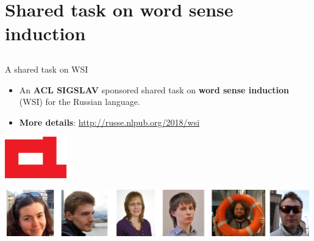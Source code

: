 \section{Shared task on word sense induction}

\subsection{}

\begin{frame}{A shared task on WSI}
  
  \begin{itemize}
  \item An \textbf{\alert{ACL SIGSLAV}} sponsored shared task on \textbf{word sense induction} (WSI) for the Russian language.
 \end{itemize} 
  
  \begin{itemize}
    \item \textbf{More details}: \url{http://russe.nlpub.org/2018/wsi}
     
  \end{itemize}
  
  \begin{center}
  	\includegraphics[width=0.2\textwidth]{figures/acl}
  \end{center}
  
   \begin{center}
  	\includegraphics[width=0.99\textwidth]{figures/russe-team}
  \end{center}
\end{frame}



